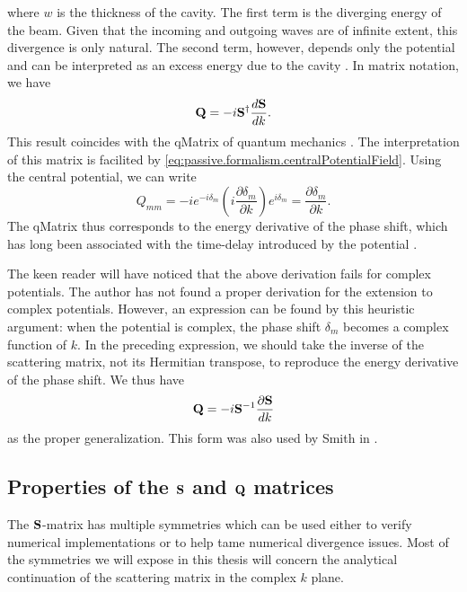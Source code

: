 where $w$ is the thickness of the cavity. The first term is the 
diverging energy of the beam. Given that the incoming 
and outgoing waves are of infinite extent, this divergence
is only natural. The second term, however, depends only the
potential and can be interpreted as an excess energy due to the
cavity \cite{GAP2013}. In matrix notation, we have
  \begin{equation}
    \mathbf{Q} = -i\mathbf{S}^\dagger\frac{d\mathbf{S}}{dk}.
  \end{equation}
This result coincides with the \gls{qMatrix} of quantum 
mechanics \cite{SMI1960}. The interpretation of this 
matrix is facilited by \eqref{eq:passive.formalism.centralPotentialField}. 
Using the central potential, we can write
  \begin{equation}
    Q_{mm} = -ie^{-i\delta_m}\left(i\frac{\partial\delta_m}{\partial k}\right)e^{i\delta_m} = \frac{\partial\delta_m}{\partial k}.
  \end{equation}
The \gls{qMatrix} thus corresponds to the energy derivative of the 
phase shift, which has long been associated with the time-delay
introduced by the potential \cite{EIS1948,SMI1960,CAR2002}. 

The keen reader will have noticed that the above derivation
fails for complex potentials. The author has not found a proper
derivation for the extension to complex potentials. However, 
an expression can be found by this heuristic argument:
when the potential is complex, the phase shift $\delta_m$
becomes a complex function of $k$. In the preceding expression, 
we should take the inverse of the scattering matrix, not its Hermitian
transpose, to reproduce the energy derivative of the phase shift.
We thus have
  \begin{equation}
   \mathbf{Q} = -i\mathbf{S}^{-1}\frac{\partial\mathbf{S}}{dk}
  \end{equation}
as the proper generalization. This form was also used by Smith in
\cite{SMI1960}.
  
\subsection{Properties of the $\mathbf{S}$ and $\mathbf{Q}$ matrices}
The $\mathbf{S}$-matrix has multiple symmetries which can be used 
either to verify numerical implementations or to help tame 
numerical divergence issues. Most of the symmetries we will
expose in this thesis will concern the analytical continuation
of the scattering matrix in the complex $k$ plane. 

